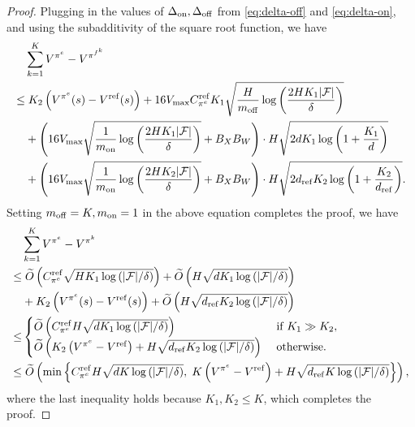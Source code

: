 \begin{proof}
Plugging in the values of $\Delta_\mathrm{on},\Delta_\mathrm{off}$ from \eqref{eq:delta-off} and \eqref{eq:delta-on}, and using the subadditivity of the square root function, we have 
{\small
\begin{equation}
    \begin{split}
        &\sum_{k=1}^K V^{\pi^e}-V^{\pi^{f^k}}\\
        \leq&\;K_2\left( V^{\pi^e}(s)-V^{\mathrm{ref}}(s) \right)+
        16V_{\max}  C_{\pi^e}^\mathrm{ref}K_1\sqrt{\frac{H}{m_\mathrm{off}}\log\left( \frac{2HK_1|\mathcal F|}{\delta} \right)}\\
        \;&+ \left( 16V_{\max}\sqrt{\frac{1}{m_\mathrm{on}}\log\left( \frac{2HK_1|\mathcal F|}{\delta} \right)}+B_XB_W \right)\cdot H\sqrt{2dK_1\log\left( 1+\frac{K_1}{d} \right)}\\
        \;&+ \left( 16V_{\max}\sqrt{\frac{1}{m_\mathrm{on}}\log\left( \frac{2HK_2|\mathcal F|}{\delta} \right)}+B_XB_W \right)\cdot H\sqrt{2d_\mathrm{ref}K_2\log\left( 1+\frac{K_2}{d_\mathrm{ref}} \right)}.
    \end{split}
\end{equation}
}
Setting $m_\mathrm{off} = K,m_\mathrm{on}=1$ in the above equation completes the proof, we have
\begin{equation}
    \begin{split}
        &\sum_{k=1}^KV^{\pi^e}-V^{\pi^k}\\
        \leq&\; \widetilde{O}\left( C_{\pi^e}^\mathrm{ref}\sqrt{HK_1\log\left( |\mathcal F|/\delta \right)} \right) + \widetilde{O}\left( H \sqrt{dK_1\log\left( |\mathcal F|/\delta \right)} \right)\\
        &+K_2\left( V^{\pi^e}(s)-V^{\mathrm{ref}}(s) \right)+\widetilde{O}\left( H \sqrt{d_\mathrm{ref}K_2\log\left( |\mathcal F|/\delta \right)} \right)\\
        \leq &\begin{cases}
            \widetilde{O}\left( C^\mathrm{ref}_{\pi^e}H\sqrt{dK_1\log\left( |\mathcal F|/\delta \right)} \right)&\text{ if } K_1\gg K_2,\\
            \widetilde{O}\left( K_2\left( V^{\pi^e}-V^\mathrm{ref} \right)+H\sqrt{d_\mathrm{ref}K_2\log\left( |\mathcal F|/\delta \right)} \right)&\text{ otherwise.} 
        \end{cases}\\
        \leq&\; \widetilde{O}\left( \min\left\{ C_{\pi^e}^\mathrm{ref}H\sqrt{dK\log\left( |\mathcal F|/\delta \right)},\;K\left( V^{\pi^e}-V^\mathrm{ref} \right)+H\sqrt{d_\mathrm{ref}K\log\left( |\mathcal F|/\delta \right)} \right\} \right),
    \end{split} 
\end{equation}
where the last inequality holds because $K_1,K_2\leq K$, which completes the proof.
\end{proof}

\iffalse

